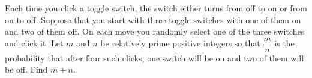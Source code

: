 Each time you click a toggle switch, the switch either turns from off to on or from on to off. Suppose that you start with three toggle switches with one of them on and two of them off. On each move you randomly select one of the three switches and click it. Let $m$ and $n$ be relatively prime positive integers so that $\dfrac{m}{n}$ is the probability that after four such clicks, one switch will be on and two of them will be off. Find $m+n$.
